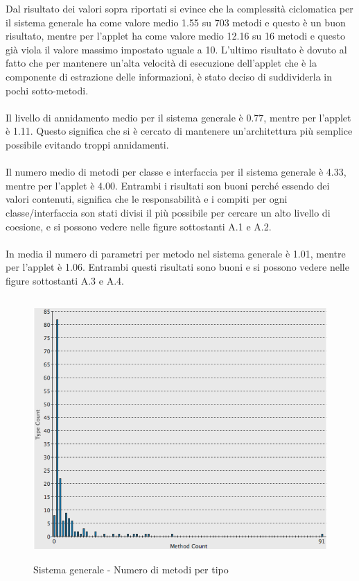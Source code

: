 Dal risultato dei valori sopra riportati si evince che la complessit\`a
ciclomatica per il sistema generale ha come valore medio 1.55 su 703
metodi e questo \`e un buon risultato, mentre per l'applet ha come valore medio
12.16 su 16 metodi e questo gi\`a viola il valore massimo impostato uguale a 10.
L'ultimo risultato \`e dovuto al fatto che per mantenere un'alta velocit\`a di
esecuzione dell'applet che \`e la componente di estrazione delle informazioni,
\`e stato deciso di suddividerla in pochi sotto-metodi. 
\\\\ 
Il livello di
annidamento medio per il sistema generale \`e 0.77, mentre per l'applet \`e
1.11. Questo significa che si \`e cercato di mantenere un'architettura pi\`u
semplice possibile evitando troppi annidamenti. 
\\\\ Il numero medio di metodi
per classe e interfaccia per il sistema generale \`e 4.33, mentre per l'applet \`e 4.00. Entrambi i risultati son buoni perch\'e
essendo dei valori contenuti, significa che le responsabilit\`a e i compiti per
ogni classe/interfaccia son stati divisi il pi\`u possibile per cercare un alto
livello di coesione, e si possono vedere nelle figure sottostanti A.1 e A.2.
\\\\
In media il numero di parametri per metodo nel sistema generale \`e 1.01, mentre
per l'applet \`e 1.06. Entrambi questi risultati sono buoni e si possono vedere
nelle figure sottostanti A.3 e A.4. 

\vspace{2cm}
\begin{figure}[htbp]
  \centering
  \includegraphics[height=10cm]{img/PQ/NumberOfMethodsPerType.png}
\caption{Sistema generale - Numero di metodi per tipo}
\end{figure}

